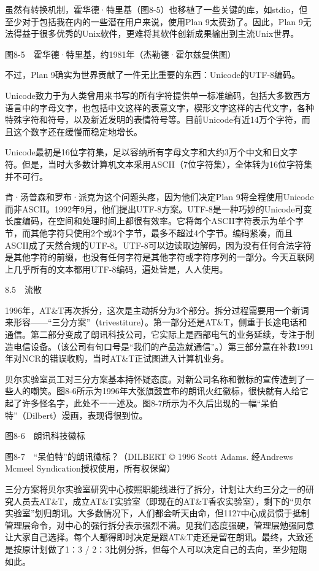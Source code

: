 \documentclass[a4paper,12pt,UTF8,twoside]{ctexbook}
\begin{document}
虽然有转换机制，霍华德·特里基（图8-5）也移植了一些关键的库，如stdio，但至少对于包括我在内的一些潜在用户来说，使用Plan 9太费劲了。因此，Plan 9无法得益于很多优秀的Unix软件，更难将其软件创新成果输出到主流Unix世界。



图8-5　霍华德·特里基，约1981年（杰勒德·霍尔兹曼供图）

不过，Plan 9确实为世界贡献了一件无比重要的东西：Unicode的UTF-8编码。

Unicode致力于为人类曾用来书写的所有字符提供单一标准编码，包括大多数西方语言中的字母文字，也包括中文这样的表意文字，楔形文字这样的古代文字，各种特殊字符和符号，以及新近发明的表情符号等。目前Unicode有近14万个字符，而且这个数字还在缓慢而稳定地增长。

Unicode最初是16位字符集，足以容纳所有字母文字和大约3万个中文和日文字符。但是，当时大多数计算机文本采用ASCII（7位字符集），全体转为16位字符集并不可行。

肯·汤普森和罗布·派克为这个问题头疼，因为他们决定Plan 9将全程使用Unicode而非ASCII。1992年9月，他们提出UTF-8方案。UTF-8是一种巧妙的Unicode可变长度编码，在空间和处理时间上都很有效率。它将每个ASCII字符表示为单个字节，而其他字符只使用2个或3个字节，最多不超过4个字节。编码紧凑，而且ASCII成了天然合规的UTF-8。UTF-8可以边读取边解码，因为没有任何合法字符是其他字符的前缀，也没有任何字符是其他字符或字符序列的一部分。今天互联网上几乎所有的文本都用UTF-8编码，遍处皆是，人人使用。





8.5　流散


1996年，AT\&T再次拆分，这次是主动拆分为3个部分。拆分过程需要用一个新词来形容——“三分方案”（trivestiture）。第一部分还是AT\&T，侧重于长途电话和通信。第二部分变成了朗讯科技公司，它实际上是西部电气的业务延续，专注于制造电信设备。（该公司有句口号是“我们的产品造就通信”。）第三部分意在补救1991年对NCR的错误收购，当时AT\&T正试图进入计算机业务。

贝尔实验室员工对三分方案基本持怀疑态度。对新公司名称和徽标的宣传遭到了一些人的嘲笑。图8-6所示为1996年大张旗鼓宣布的朗讯火红徽标，很快就有人给它起了许多怪名字，此处不一一述及。图8-7所示为不久后出现的一幅“呆伯特”（Dilbert）漫画，表现得很到位。



图8-6　朗讯科技徽标



图8-7　“呆伯特”的朗讯徽标？（DILBERT © 1996 Scott Adams. 经Andrews Mcmeel Syndication授权使用，所有权保留）

三分方案将贝尔实验室研究中心按照职能线进行了拆分，计划让大约三分之一的研究人员去AT\&T，成立AT\&T实验室（即现在的AT\&T香农实验室），剩下的“贝尔实验室”划归朗讯。大多数情况下，人们都会听天由命，但1127中心成员惯于抵制管理层命令，对中心的强行拆分表示强烈不满。见我们态度强硬，管理层勉强同意让大家自己选择。每个人都得即时决定是跟AT\&T走还是留在朗讯。最终，大致还是按原计划做了1∶3 / 2∶3比例分拆，但每个人可以决定自己的去向，至少短期如此。
\end{document}
